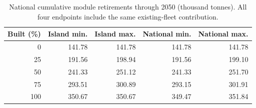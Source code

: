 \begin{table}[htbp]\centering\small
\caption{National cumulative module retirements through 2050 (thousand tonnes). All four endpoints include the same existing-fleet contribution.}\label{tab:cal}
\begin{tabular}{rrrrr}\toprule
Built (\%) & Island min. & Island max. & National min. & National max. \\
\midrule
0 & 141.78 & 141.78 & 141.78 & 141.78 \\
25 & 191.56 & 198.94 & 191.56 & 199.10 \\
50 & 241.33 & 251.12 & 241.33 & 251.70 \\
75 & 293.51 & 300.89 & 293.15 & 301.91 \\
100 & 350.67 & 350.67 & 349.47 & 351.84 \\
\bottomrule\end{tabular}\end{table}
